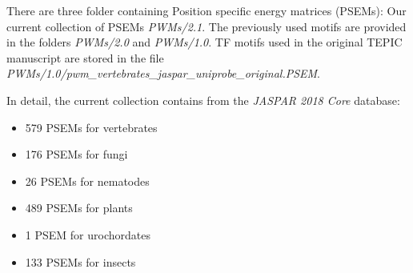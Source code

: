 \documentclass{article}
\begin{document}
There are three folder containing Position specific energy matrices (PSEMs): Our current collection of PSEMs \textit{PWMs/2.1}. The previously used motifs are provided in the folders \textit{PWMs/2.0} and \textit{PWMs/1.0}. 
TF motifs used in the original TEPIC manuscript are stored in the file \\\textit{PWMs/1.0/pwm\_vertebrates\_jaspar\_uniprobe\_original.PSEM}.

In detail, the current collection contains from the \textit{JASPAR 2018 Core} database:
\begin{itemize}
\item 579 PSEMs for vertebrates
\item 176 PSEMs for fungi
\item 26 PSEMs for nematodes
\item 489 PSEMs for plants
\item 1 PSEM for urochordates
\item 133 PSEMs for insects
\end{itemize}
\end{document}
